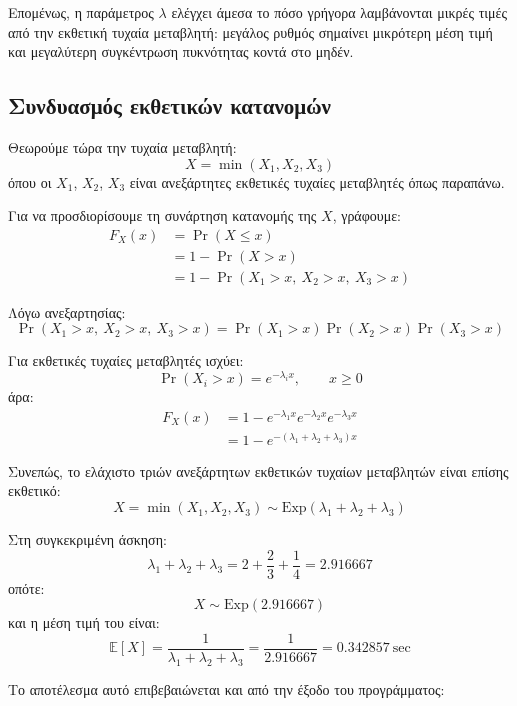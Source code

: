 \documentclass{article}
\begin{document}
Επομένως, η παράμετρος \(\lambda\) ελέγχει άμεσα το πόσο γρήγορα λαμβάνονται μικρές
τιμές από την εκθετική τυχαία μεταβλητή: μεγάλος ρυθμός σημαίνει μικρότερη μέση τιμή
και μεγαλύτερη συγκέντρωση πυκνότητας κοντά στο μηδέν.

\subsection{Συνδυασμός εκθετικών κατανομών}

Θεωρούμε τώρα την τυχαία μεταβλητή:
\[
X = \min(X_1, X_2, X_3)
\]
όπου οι \(X_1\), \(X_2\), \(X_3\) είναι ανεξάρτητες εκθετικές τυχαίες μεταβλητές όπως
παραπάνω.

Για να προσδιορίσουμε τη συνάρτηση κατανομής της \(X\), γράφουμε:
\begin{align}
    F_X(x)
    &= \Pr(X \leq x) \\
    &= 1 - \Pr(X > x) \\
    &= 1 - \Pr(X_1 > x,\ X_2 > x,\ X_3 > x)
\end{align}

Λόγω ανεξαρτησίας:
\begin{equation}
    \Pr(X_1 > x,\ X_2 > x,\ X_3 > x)
    =
    \Pr(X_1 > x)\Pr(X_2 > x)\Pr(X_3 > x)
\end{equation}

Για εκθετικές τυχαίες μεταβλητές ισχύει:
\[
\Pr(X_i > x) = e^{-\lambda_i x}, \qquad x \geq 0
\]
άρα:
\begin{align}
    F_X(x)
    &= 1 - e^{-\lambda_1 x} e^{-\lambda_2 x} e^{-\lambda_3 x} \\
    &= 1 - e^{-(\lambda_1+\lambda_2+\lambda_3)x}
\end{align}

Συνεπώς, το ελάχιστο τριών ανεξάρτητων εκθετικών τυχαίων μεταβλητών είναι επίσης εκθετικό:
\begin{equation}
    X = \min(X_1, X_2, X_3) \sim \mathrm{Exp}(\lambda_1+\lambda_2+\lambda_3)
\end{equation}

Στη συγκεκριμένη άσκηση:
\[
\lambda_1+\lambda_2+\lambda_3
=
2 + \frac{2}{3} + \frac{1}{4}
=
2.916667
\]
οπότε:
\[
X \sim \mathrm{Exp}(2.916667)
\]
και η μέση τιμή του είναι:
\begin{equation}
    \mathbb{E}[X] = \frac{1}{\lambda_1+\lambda_2+\lambda_3}
    = \frac{1}{2.916667}
    = 0.342857\ \text{sec}
\end{equation}

Το αποτέλεσμα αυτό επιβεβαιώνεται και από την έξοδο του προγράμματος:
\end{document}

